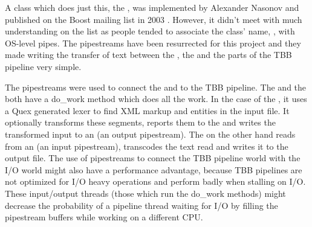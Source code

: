 A class which does just this, the , was implemented by
Alexander Nasonov and published on the Boost mailing list in 2003
\cite{web-pipes}. However, it didn't meet with much understanding on the list
as people tended to associate the class' name, , with OS-level
pipes. The pipestreams have been resurrected for this project and they made
writing the transfer of text between the , the
 and the parts of the TBB pipeline very simple.

The pipestreams were used to connect the  and
 to the TBB pipeline. The  and the
 both have a do\_\-work method which does all the work. In the
case of the , it uses a Quex generated lexer to find XML
markup and entities in the input file. It optionally transforms these
segments, reports them to the  and writes the
transformed input to an  (an output pipestream). The
 on the other hand reads from an  (an input
pipestream), transcodes the text read and writes it to the output file. The
use of pipestreams to connect the TBB pipeline world with the I/O world might
also have a performance advantage, because TBB pipelines are not optimized for
I/O heavy operations and perform badly when stalling on I/O. These
input/output threads (those which run the do\_\-work methods) might decrease
the probability of a pipeline thread waiting for I/O by filling the pipestream
buffers while working on a different CPU.
